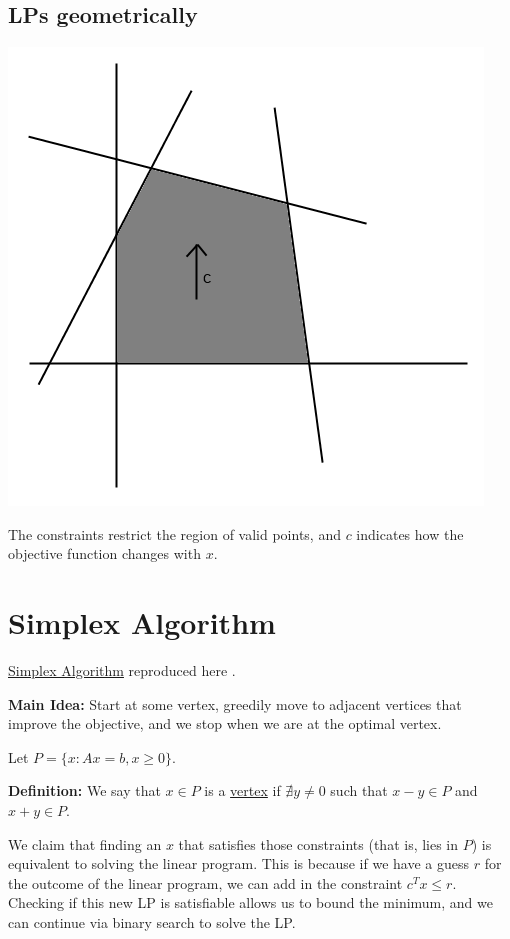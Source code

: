 \documentclass[11pt]{article}
\begin{document}
\subsection{LPs geometrically}

\begin{center}
\includegraphics[scale=0.5]{graph.png}
\end{center}

The constraints restrict the region of valid points, and $c$ indicates how the objective function changes with $x$.

\section{Simplex Algorithm}

\underline{Simplex Algorithm} reproduced here \cite{Dantzig47}.

{\bf Main Idea:} Start at some vertex, greedily move to adjacent vertices that improve the objective, and we stop when we are at the optimal vertex.

Let $P=\{x:Ax=b,x\ge 0\}$.

{\bf Definition:} We say that $x\in P$ is a \underline{vertex} if $\nexists y\ne 0$ such that $x-y\in P$ and $x+y\in P$.

We claim that finding an $x$ that satisfies those constraints (that is, lies in $P$) is equivalent to solving the linear program. This is because if we have a guess $r$ for the outcome of the linear program, we can add in the constraint $c^Tx\le r$. Checking if this new LP is satisfiable allows us to bound the minimum, and we can continue via binary search to solve the LP.
\end{document}
